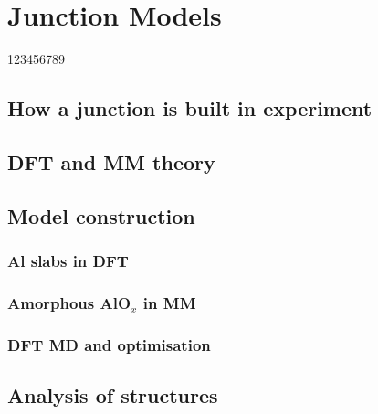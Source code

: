 




  \frontmatter
    \ifdraft{}{%
                      
    }   

    \begin{singlespace}  %
    \tableofcontents     %
    \end{singlespace}
   
    
    
    

  \mainmatter
    

    \chapter{Junction Models}
    123456789
    \section{How a junction is built in experiment}
    \section{DFT and MM theory}
    \section{Model construction}
    \subsection{Al slabs in DFT}
    \subsection{Amorphous AlO$_{x}$ in MM}
    \subsection{DFT MD and optimisation}
    \section{Analysis of structures}
